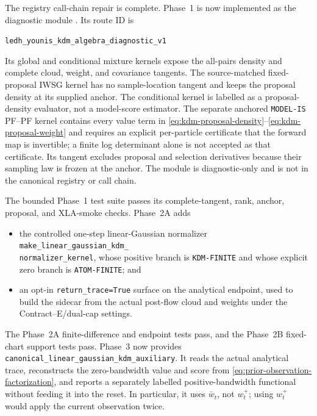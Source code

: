 \documentclass[11pt]{article}
\begin{document}
The registry call-chain repair is complete.  Phase~1 is now implemented as the
diagnostic module
.  Its route ID is
\begin{center}
\texttt{ledh\_younis\_kdm\_algebra\_}\texttt{diagnostic\_v1}
\end{center}
Its global and
conditional mixture kernels expose the all-pairs density and complete cloud,
weight, and covariance tangents.  The source-matched fixed-proposal IWSG
kernel has no sample-location tangent and keeps the proposal density at its
supplied anchor.  The conditional kernel is labelled as a proposal-density
evaluator, not a model-score estimator.  The separate anchored
\texttt{MODEL-IS} PF--PF kernel contains every value term in
\eqref{eq:kdm-proposal-density}--\eqref{eq:kdm-proposal-weight} and requires
an explicit per-particle certificate that the forward map is invertible; a
finite log determinant alone is not accepted as that certificate.  Its
tangent excludes proposal and selection derivatives because their sampling
law is frozen at the anchor.  The module is diagnostic-only and is not in the
canonical registry or call chain.

\begin{samepage}
The bounded Phase~1 test suite passes its complete-tangent, rank, anchor,
proposal, and XLA-smoke checks.  Phase~2A adds

\begin{itemize}[leftmargin=2em]
  \item the controlled one-step linear-Gaussian normalizer\\
        \texttt{make\_linear\_gaussian\_kdm\_}\\
        \texttt{normalizer\_kernel}, whose
        positive branch is \texttt{KDM-FINITE} and whose explicit zero branch
        is \texttt{ATOM-FINITE}; and
  \item an opt-in \texttt{return\_trace=True} surface on the analytical
        endpoint, used to build the sidecar from the actual post-flow cloud
        and weights under the Contract--E/dual-cap settings.
\end{itemize}
\end{samepage}

The Phase~2A finite-difference and endpoint tests pass, and the Phase~2B
fixed-chart support tests pass.  Phase~3 now provides
\texttt{canonical\_linear\_gaussian\_kdm\_auxiliary}.  It reads the actual
analytical trace, reconstructs the zero-bandwidth value and score from
\eqref{eq:prior-observation-factorization}, and reports a separately labelled
positive-bandwidth functional without feeding it into the reset.  In
particular, it uses $\bar w_t$, not $w_t^+$; using $w_t^+$ would apply the
current observation twice.
\end{document}
